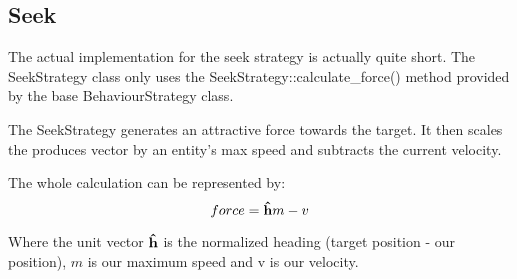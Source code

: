 \subsection{Seek}
\label{sec:seek-behaviour}
The actual implementation for the seek strategy is actually quite short. The 
SeekStrategy class only uses the SeekStrategy::calculate\_force() method 
provided by the base BehaviourStrategy class.

The SeekStrategy generates an attractive force towards the target. It then 
scales the produces vector by an entity's max speed and subtracts the current 
velocity. \cite[pg. 91]{buckland}

The whole calculation can be represented by: \\
\large 
$$ force = \boldsymbol{\hat{\textbf{h}}} m - v $$
\normalsize

Where the unit vector $ \boldsymbol{\hat{\textbf{h}}} $ is the normalized heading (target position - 
our position), $ m $ is our maximum speed and v is our velocity.


